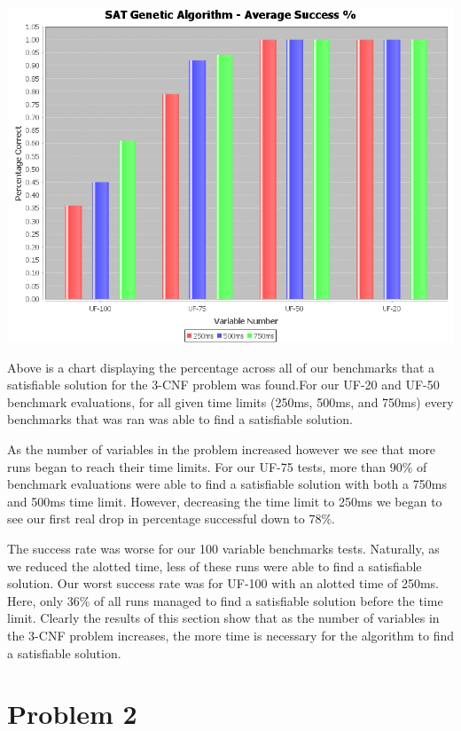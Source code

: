 \documentclass[10pt,a4paper]{article}
\begin{document}
	\begin{center}
		\includegraphics[scale=0.35]{average_success}
	\end{center}
	
	 Above is a chart displaying the percentage across all of our benchmarks that a satisfiable solution for the 3-CNF problem was found.For our UF-20 and UF-50 benchmark evaluations, for all given time limits (250ms, 500ms, and 750ms) every benchmarks that was ran was able to find a satisfiable solution.
	
	As the number of variables in the problem increased however we see that more runs began to reach their time limits. For our UF-75 tests, more than 90\% of benchmark evaluations were able to find a satisfiable solution with both a 750ms and 500ms time limit. However, decreasing the time limit to 250ms we began to see our first real drop in percentage successful down to 78\%.
	
	The success rate was worse for our 100 variable benchmarks tests. Naturally, as we reduced the alotted time, less of these runs were able to find a satisfiable solution. Our worst success rate was for UF-100 with an alotted time of 250ms. Here, only 36\% of all runs managed to find a satisfiable solution before the time limit. Clearly the results of this section show that as the number of variables in the 3-CNF problem increases, the more time is necessary for the algorithm to find a satisfiable solution.
	
	\section*{Problem 2}
	
\end{document}
